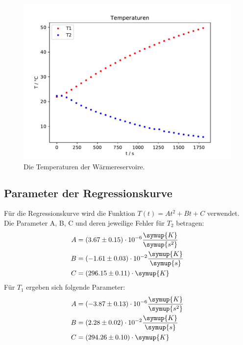 \begin{figure}[H]
  \centering
  \includegraphics{build/Temperaturen.pdf}
  \caption{Die Temperaturen der Wärmereservoire.}
  \label{fig:Temperaturen}
\end{figure}

\subsection{Parameter der Regressionskurve}
Für die Regressionskurve wird die Funktion $T(t) = At^2 + Bt + C$ verwendet. Die
Parameter A, B, C und deren jeweilige Fehler für $T_2$ betragen:
\begin{align*}
  A &= (3.67 \pm 0.15) \cdot 10^{-6} \frac{\symup{K}}{\symup{s^2}} \\
  B &= (-1.61 \pm 0.03) \cdot 10^{-2} \frac{\symup{K}}{\symup{s}}  \\
  C &= (296.15 \pm 0.11) \cdot  \symup{K}
\end{align*}
Für $T_1$ ergeben sich folgende Parameter:
\begin{align*}
  A &= (-3.87 \pm 0.13) \cdot 10^{-6} \frac{\symup{K}}{\symup{s^2}} \\
  B &= (2.28 \pm 0.02)  \cdot 10^{-2} \frac{\symup{K}}{\symup{s}}  \\
  C &= (294.26 \pm 0.10 )\cdot \symup{K}
\end{align*}
